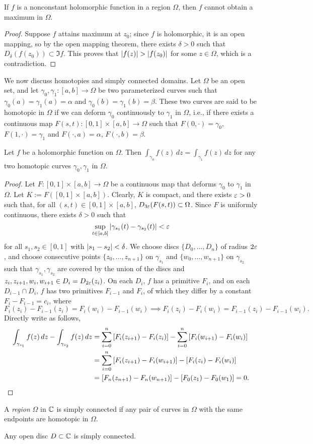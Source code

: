 \begin{theorem}
    If $f$ is a nonconstant holomorphic function in a region $\Omega$, then $f$ cannot obtain a maximum in $\Omega$.
\end{theorem}
\begin{proof}
    Suppose $f$ attains maximum at $z_0$; since $f$ is holomorphic, it is an open mapping, so by the open mapping theorem, there exists $\delta > 0$ such that $D_\delta(f(z_0)) \subset \Im f$. This proves that $\left\lvert f(z) \right\rvert > \left\lvert f(z_0) \right\rvert$ for some $z \in \Omega$, which is a contradiction.
\end{proof}
\noindent We now discuss homotopies and simply connected domains. Let $\Omega$ be an open set, and let $\gamma_0, \gamma_1 : [a, b] \to \Omega$ be two parameterized curves such that $\gamma_0(a) = \gamma_1(a) = \alpha$ and $\gamma_0(b) = \gamma_1(b) = \beta$. These two curves are said to be homotopic in $\Omega$ if we can deform $\gamma_0$ continuously to $\gamma_1$ in $\Omega$, i.e., if there exists a continuous map $F(s, t) : [0, 1] \times [a, b] \to \Omega$ such that $F(0, \cdot) = \gamma_0$, $F(1, \cdot) = \gamma_1$ and $F(\cdot, a) = \alpha$, $F(\cdot, b) = \beta$.
\begin{theorem}[\S 3.5.1]
    Let $f$ be a holomorphic function on $\Omega$. Then $\int_{\gamma_0} f(z) \, dz = \int_{\gamma_1} f(z) \, dz$ for any two homotopic curves $\gamma_0, \gamma_1$ in $\Omega$.
\end{theorem}
\begin{proof}
    Let $F : [0, 1] \times [a, b] \to \Omega$ be a continuous map that deforms $\gamma_0$ to $\gamma_1$ in $\Omega$. Let $K := F([0, 1] \times [a, b])$. Clearly, $K$ is compact, and there exists $\varepsilon > 0$ such that, for all $(s, t) \in [0, 1] \times [a, b]$, $D_{3\varepsilon}(F(s, t)) \subset \Omega$. Since $F$ is uniformly continuous, there exists $\delta > 0$ such that
    \[ \sup_{t \in [a, b]} \left\lvert \gamma_{s_1}(t) - \gamma_{s_2}(t) \right\rvert < \varepsilon \]
    for all $s_1, s_2 \in [0, 1]$ with $\left\lvert s_1 - s_2 \right\rvert < \delta$. We choose discs $\{D_0, \dots, D_n\}$ of radius $2\varepsilon$, and choose consecutive points $\{z_0, \dots, z_{n+1}\}$ on $\gamma_{s_1}$ and $\{w_0, \dots, w_{n+1}\}$ on $\gamma_{s_2}$ such that $\gamma_{s_1}, \gamma_{s_2}$ are covered by the union of the discs and $z_i, z_{i+1}, w_i, w_{i+1} \in D_i = D_{2\varepsilon}(z_i)$. On each $D_i$, $f$ has a primitive $F_i$, and on each $D_{i-1} \cap D_i$, $f$ has two primitives $F_{i-1}$ and $F_i$, of which they differ by a constant $F_i - F_{i-1} = c_i$, where
    \[ F_i(z_i) - F_{i-1}(z_i) = F_i(w_i) - F_{i-1}(w_i) \implies F_i(z_i) - F_i(w_i) = F_{i-1}(z_i) - F_{i-1}(w_i). \]
    Directly write as follows,
    \begin{align*}
        \int_{\gamma_{s_1}} f(z) \, dz - \int_{\gamma_{s_2}} f(z) \, dz &= \sum_{i=0}^n \left[F_i(z_{i+1}) - F_i(z_i)\right] - \sum_{i=0}^n \left[F_i(w_{i+1}) - F_i(w_i)\right] \\
        &= \sum_{i=0}^n \left[F_i(z_{i+1}) - F_i(w_{i+1})\right] - \left[F_i(z_i) - F_i(w_i)\right] \\
        &= \left[F_n(z_{n+1}) - F_n(w_{n+1})\right] - \left[F_0(z_1) - F_0(w_1)\right] = 0. \qedhere
    \end{align*}
\end{proof}
\noindent A \textit{region} $\Omega$ in $\mathbb C$ is simply connected if any pair of curves in $\Omega$ with the same endpoints are homotopic in $\Omega$.
\begin{example}
    Any open disc $D \subset \mathbb C$ is simply connected.
\end{example}